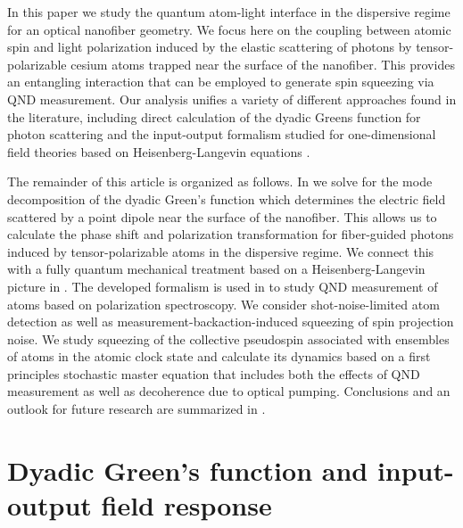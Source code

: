 \documentclass[preprint, aps,pra,onecolumn]{revtex4-1} %
\begin{document}
In this paper we study the quantum atom-light interface in the dispersive regime {\color{blue}  for an optical nanofiber geometry.}  We focus here on the coupling between atomic spin and light polarization induced by the elastic scattering of photons by tensor-polarizable cesium atoms trapped near the surface of the nanofiber.  This provides an entangling interaction {\color{blue} that can be employed to generate} spin squeezing via QND measurement.  Our analysis unifies a variety of different approaches found in the literature, including direct calculation of the dyadic Greens function for photon scattering \cite{sakoda_optical_1996, dung_spontaneous_2000, sondergaard_general_2001, klimov_spontaneous_2004, wubs_multiple-scattering_2004, fussell_decay_2005, manga_rao_single_2007, dzsotjan_quantum_2010} and the input-output formalism studied for one-dimensional field theories based on Heisenberg-Langevin equations \cite{gardiner_input_1985, blow_continuum_1990, shen_coherent_2005, le_kien_spontaneous_2005, le_kien_correlations_2008, fan_input-output_2010}.

The remainder of this article is organized as follows.  
In  we solve for the mode decomposition of the dyadic Green's function which determines the electric field scattered by a point dipole near the surface of the nanofiber.  
This allows us to calculate the phase shift and polarization transformation for fiber-guided photons induced by tensor-polarizable atoms in the dispersive regime.  
We connect this with a fully quantum mechanical treatment based on a Heisenberg-Langevin picture in .  
The developed formalism is used in  to study QND measurement of atoms based on polarization spectroscopy. 
We consider shot-noise-limited atom detection as well as measurement-backaction-induced squeezing of spin projection noise.  
We study squeezing of the collective pseudospin associated with ensembles of atoms in the atomic clock state and calculate its dynamics based on a first principles stochastic master equation that includes both the effects of QND measurement as well as decoherence due to optical pumping.  
Conclusions and an outlook for future research are summarized in .  


\section{Dyadic Green's function and input-output field response} \label{Sec::GreensFunction}
\end{document}
